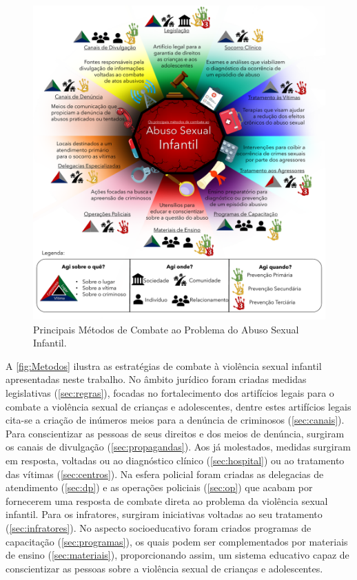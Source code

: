 \begin{figure}[htb]
	\caption{\label{fig:Metodos}Principais Métodos de Combate ao Problema do Abuso Sexual Infantil.}\vspace{0.4cm}
    \includegraphics[width=\linewidth]{./Visuais/MétodosCombate.pdf}
\end{figure}

A \autoref{fig:Metodos} ilustra as estratégias de combate à violência sexual infantil apresentadas neste trabalho. No âmbito jurídico foram criadas medidas legislativas (\autoref{sec:regras}), focadas no fortalecimento dos artifícios legais para o combate a violência sexual de crianças e adolescentes, dentre estes artifícios legais cita-se a criação de inúmeros meios para a denúncia de criminosos (\autoref{sec:canais}). Para conscientizar as pessoas de seus direitos e dos meios de denúncia, surgiram os canais de divulgação (\autoref{sec:propagandas}). Aos já molestados, medidas surgiram em resposta, voltadas ou ao diagnóstico clínico (\autoref{sec:hospital}) ou ao tratamento das vítimas (\autoref{sec:centros}). Na esfera policial foram criadas as delegacias de atendimento (\autoref{sec:dp}) e as operações policiais (\autoref{sec:op}) que acabam por fornecerem uma resposta de combate direta ao problema da violência sexual infantil. Para os infratores, surgiram iniciativas voltadas ao seu tratamento (\autoref{sec:infratores}). No aspecto socioeducativo foram criados programas de capacitação (\autoref{sec:programas}), os quais podem ser complementados por materiais de ensino (\autoref{sec:materiais}), proporcionando assim, um sistema educativo capaz de conscientizar as pessoas sobre a violência sexual de crianças e adolescentes. 

